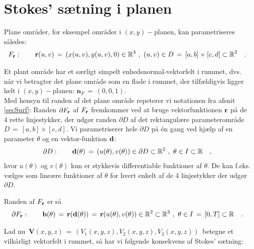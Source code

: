
\section{Stokes' sætning i planen} \label{secStokesInPlane}

Plane områder, for eksempel områder i $(x, y)-$planen, kan parametriseres således:
\begin{equation}
F_{\bf{r}}: \qquad  {\bf{r}}(u,v) \, = \,
(x(u,v), y(u,v), 0) \in \mathbb{R}^{3} \,\,
, \,\, (u,v) \in D\, = \, [a, b]\times[c, d]
\subset \mathbb{R}^{2} \quad.
\end{equation}

Et plant område har et særligt simpelt enhedsnormal-vektorfelt i rummet, dvs. når vi betragter
det plane område som en flade i rummet, der tilfældigvis ligger helt i $(x,y)-$planen:
$\mathbf{n}_{F} \, = \, (0, 0, 1)$. \\

Med hensyn til randen af det plane område repeterer vi notationen fra
afsnit \ref{secSurf}:
Randen $\partial F_{\bf{r}}$ af $F_{\bf{r}}$
fremkommer ved at bruge vektorfunktionen $\bf{r}$
på de 4 rette linjestykker, der udgør randen
$\partial D$ af det rektangulære parameterområde
$D\, = \, [a, b]\times[c, d]$. Vi parametriserer
hele $\partial D$ på \'{e}n gang ved hjælp af en
parameter $\theta$ og en vektor-funktion
$\bf{d}$:
$$
\partial D: \qquad  {\bf{d}}(\theta) \, = \, (u(\theta), v(\theta)) \in
\partial D \subset \mathbb{R}^{2} \,\, , \,\, \theta \in I \subset \mathbb{R} \quad,
$$
hvor $u(\theta)$ og $v(\theta)$ kun er stykkevis
differentiable funktioner af $\theta$. De kan
f.eks. vælges som lineære funktioner af $\theta$
for hvert enkelt  af de 4 linjestykker der udgør
$\partial D$.

Randen af $F_{\bf{r}}$ er så
\begin{equation}
\partial F_{\bf{r}}: \qquad  {\bf{b}}(\theta)\,
= \,{\bf{r}}({\bf{d}}(\theta)) \, = \,
{\bf{r}}(u(\theta), v(\theta)) \in
\mathbb{R}^{2} \subset \mathbb{R}^{3}\,\, , \,\, \theta \in I \, = \, [0, T] \subset
\mathbb{R} \quad.
\end{equation}


Lad nu $\,\mathbf{V}(x,y,z) \, = \, (V_{1}(x,y,z), V_{2}(x,y,z), V_{3}(x,y,z))\,$ betegne et vilkårligt vektorfelt i rummet, så har vi følgende konsekvens af Stokes' sætning:

